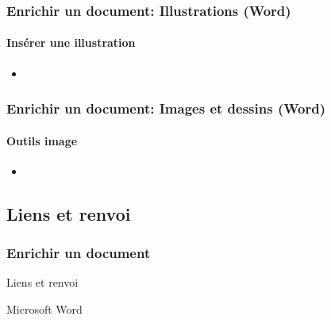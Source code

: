 \documentclass[xcolor=table]{beamer}
\begin{document}
\begin{frame}[t]
\frametitle{Enrichir un document: Illustrations (Word)}
\framesubtitle{Insérer une illustration}

\begin{minipage}{0.43\textwidth}
	\begin{itemize}
		\item 
	\end{itemize}
\end{minipage}
\begin{minipage}{0.28\textwidth}
	
	
\end{minipage}
\begin{minipage}{0.27\textwidth}	
\end{minipage}


\end{frame}


\begin{frame}[t]
\frametitle{Enrichir un document: Images et dessins (Word)}
\framesubtitle{Outils image}


\begin{minipage}{0.56\textwidth}
	\begin{itemize}
		\item 
	\end{itemize}
\end{minipage}
\begin{minipage}{0.22\textwidth}
\end{minipage}
\begin{minipage}{0.20\textwidth}	
\end{minipage}

\end{frame}

\subsection{Liens et renvoi}

\begin{frame}
\frametitle{Enrichir un document}

\begin{center}
	Liens et renvoi 
	
	Microsoft Word
\end{center}

\end{frame}
\end{document}
